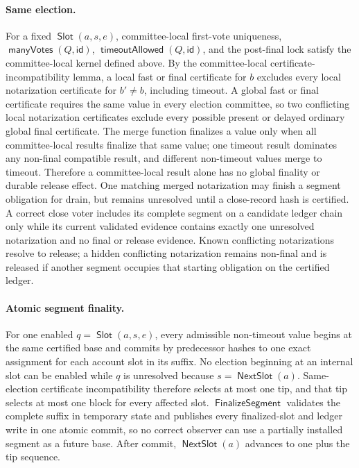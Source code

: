\documentclass[sigplan,twocolumn,review,anonymous]{acmart}
\newcommand{\func}[1]{\operatorname{\mathsf{#1}}}
\newcommand{\manyVotes}{\func{manyVotes}}
\newcommand{\id}{\mathsf{id}}
\newcommand{\Slot}{\func{Slot}}
\newcommand{\NextSlot}{\func{NextSlot}}
\newcommand{\FinalizeSegment}{\func{FinalizeSegment}}
\newcommand{\timeoutAllowed}{\func{timeoutAllowed}}
\begin{document}
\paragraph{Same election.}
For a fixed \(\Slot(a,s,e)\), committee-local first-vote uniqueness, \(\manyVotes(Q,\id)\),
\(\timeoutAllowed(Q,\id)\), and the post-final lock satisfy the committee-local kernel defined above.
By the committee-local certificate-incompatibility lemma, a local fast or final certificate for \(b\)
excludes every
local notarization certificate for \(b'\neq b\), including timeout.  A global fast or final certificate
requires the same value in every election committee, so two conflicting local notarization
certificates exclude every possible present or delayed ordinary global final certificate.  The merge
function finalizes a value only when all committee-local results finalize that same value; one timeout
result dominates any non-final compatible result, and different non-timeout values merge to timeout.
Therefore a committee-local result alone has no global finality or durable release effect.  One
matching merged notarization may finish a segment obligation for drain, but remains unresolved until a close-record
hash is certified.  A correct close voter includes its complete segment on a candidate ledger chain only while its
current validated evidence contains exactly one unresolved notarization and no final or release
evidence.  Known conflicting notarizations resolve to release; a hidden conflicting notarization
remains non-final and is released if another segment occupies that starting obligation on the certified
ledger.

\paragraph{Atomic segment finality.}
For one enabled \(q=\Slot(a,s,e)\), every admissible non-timeout value begins at the same certified
base and commits by predecessor hashes to one exact assignment for each account slot in its suffix.  No
election beginning at an internal slot can be enabled while \(q\) is unresolved because
\(s=\NextSlot(a)\).  Same-election certificate incompatibility therefore selects at most one tip, and
that tip selects at most one block for every affected slot.  \(\FinalizeSegment\) validates the complete
suffix in temporary state and publishes every finalized-slot and ledger write in one atomic commit, so
no correct observer can use a partially installed segment as a future base.  After commit,
\(\NextSlot(a)\) advances to one plus the tip sequence.
\end{document}
